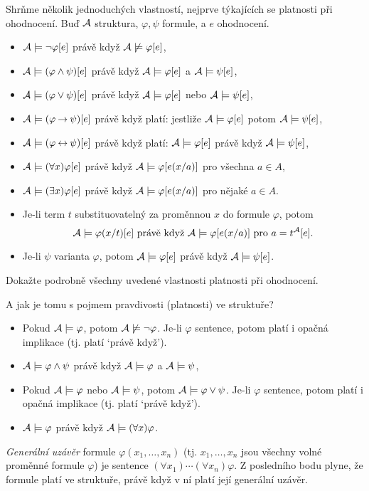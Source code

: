 Shrňme několik jednoduchých vlastností, nejprve týkajících se platnosti při ohodnocení. Buď $\mathcal{A}$ struktura, $\varphi,\psi$ formule, a $e$ ohodnocení.
\begin{itemize}
    \item $\mathcal{A}\models\neg\varphi[e]$ právě když $\mathcal{A}\not\models\varphi[e]$,
    \item $\mathcal{A}\models(\varphi\land\psi)[e]$ právě když $\mathcal{A}\models\varphi[e]$ a $\mathcal{A}\models\psi[e]$,
    \item $\mathcal{A}\models(\varphi\lor\psi)[e]$ právě když $\mathcal{A}\models\varphi[e]$ nebo $\mathcal{A}\models\psi[e]$,
    \item $\mathcal{A}\models(\varphi\mathbin{\rightarrow}\psi)[e]$ právě když platí: jestliže $\mathcal{A}\models\varphi[e]$ potom $\mathcal{A} \models\psi[e]$,
    \item $\mathcal{A}\models(\varphi\mathbin{\leftrightarrow}\psi)[e]$ právě když platí: $\mathcal{A}\models\varphi[e]$ právě když $\mathcal{A}\models\psi[e]
    $,
    \item $\mathcal{A}\models(\forall x)\varphi[e]$ právě když $\mathcal{A}\models\varphi[e(x/a)]$ pro všechna $a\in A$,
    \item $\mathcal{A}\models(\exists x)\varphi[e]$ právě když $\mathcal{A}\models\varphi[e(x/a)]$ pro nějaké $a\in A$.
    \item Je-li term $t$ substituovatelný za proměnnou $x$ do formule $\varphi$, potom
    $$
    \mathcal{A}\models\varphi(x/t)[e]\text{ právě když }\mathcal{A}\models\varphi[e(x/a)]\text{ pro }a=t^{\mathcal{A}}[e].
    $$
    \item Je-li $\psi$ varianta $\varphi$, potom $\mathcal{A}\models\varphi[e]$ právě když $\mathcal{A}\models\psi[e]$.
\end{itemize}

\begin{exercise}
    Dokažte podrobně všechny uvedené vlastnosti platnosti při ohodnocení.
\end{exercise}

A jak je tomu s pojmem pravdivosti (platnosti) ve struktuře?
\begin{itemize}
    \item Pokud $\mathcal{A}\models\varphi$, potom $\mathcal{A}\not\models\neg\varphi$. Je-li $\varphi$ sentence, potom platí i opačná implikace (tj. platí `právě když').
    \item $\mathcal{A}\models\varphi\land\psi$ právě když $\mathcal{A}\models\varphi$ a $\mathcal{A}\models\psi$,
    \item Pokud $\mathcal{A}\models\varphi$ nebo $\mathcal{A}\models\psi$, potom $\mathcal{A}\models\varphi\lor\psi$. Je-li $\varphi$ sentence, potom platí i opačná implikace (tj. platí `právě když').
    \item $\mathcal{A}\models\varphi$ právě když $\mathcal{A}\models
    (\forall x)\varphi$.
\end{itemize}
\emph{Generální uzávěr} formule $\varphi(x_1,\dots,x_n)$ (tj. $x_1,\dots,x_n$ jsou všechny volné proměnné formule $\varphi$) je sentence $(\forall x_1)\cdots(\forall x_n)\varphi$. Z posledního bodu plyne, že formule platí ve struktuře, právě když v ní platí její generální uzávěr.

